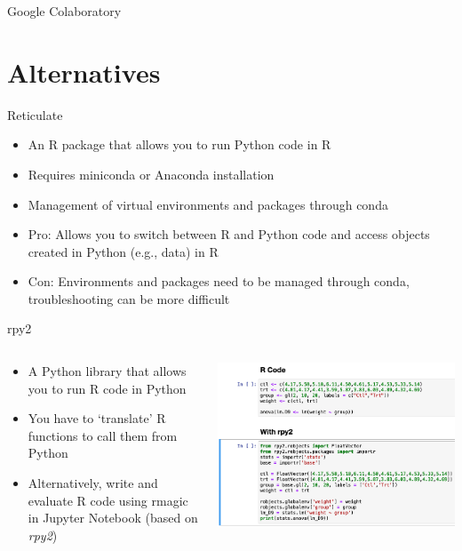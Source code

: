 \documentclass[10pt, aspectratio=169]{beamer}
\newcommand{\gemph}[1]{\textcolor{mzesgold}{#1}}
\begin{document}
{\begin{frame}{Google Colaboratory}
    
\end{frame}

 	\section{Alternatives}
\begin{frame}{Reticulate}
    \begin{itemize}
        \item An R package that allows you to run Python code in R
        \item Requires miniconda or Anaconda installation
        \item Management of virtual environments and packages through conda
        \item Pro: Allows you to switch between R and Python code and access objects created in Python (e.g., data) in R
        \item Con: Environments and packages need to be managed through conda, troubleshooting can be more difficult
    \end{itemize}
\end{frame}

	\begin{frame}{rpy2}
  \begin{columns}
\begin{column}{0.5\textwidth}
    \begin{itemize}
        \item A Python library that allows you to run R code in Python
        \item You have to ‘translate’ R functions to call them from Python
        \item Alternatively, write and evaluate R code using \gemph{rmagic} in Jupyter Notebook (based on \textit{rpy2})
    \end{itemize}
\end{column}
\begin{column}{0.5\textwidth}  %
    \begin{center}
      \includegraphics[scale=.28]{Day 1/Slides/LaTeX files/rpy2.png} 
     \end{center}
\end{column}
\end{columns}
  \end{frame}


}
\end{document}
